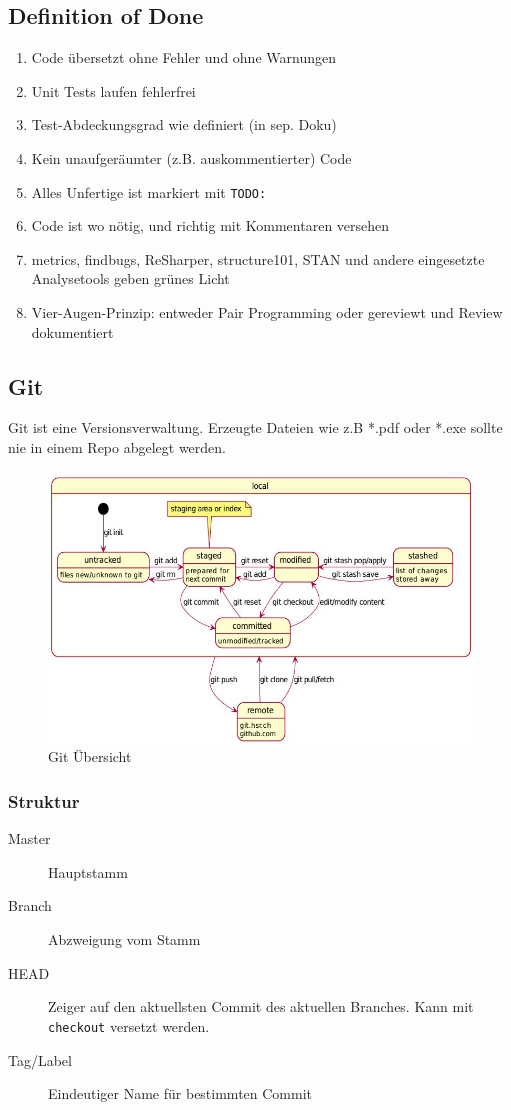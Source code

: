 \subsection{Definition of Done}
\begin{enumerate}
	\item Code übersetzt ohne Fehler und ohne Warnungen
	\item Unit Tests laufen fehlerfrei
	\item Test-Abdeckungsgrad wie definiert (in sep. Doku)
	\item Kein unaufgeräumter (z.B. auskommentierter) Code
	\item Alles Unfertige ist markiert mit \lstinline|TODO:|
	\item Code ist wo nötig, und richtig mit Kommentaren versehen
	\item metrics, findbugs, ReSharper, structure101, STAN und andere 
	eingesetzte Analysetools geben grünes Licht
	\item Vier-Augen-Prinzip: entweder Pair Programming oder gereviewt und 
	Review dokumentiert
\end{enumerate}


\subsection{Git}
Git ist eine Versionsverwaltung. Erzeugte Dateien wie z.B *.pdf oder *.exe sollte nie in einem Repo abgelegt werden.
\begin{figure}[h]
	\centering
	\includegraphics[width=0.9\linewidth]{images/git_overview}
	\caption{Git Übersicht}
	\label{fig:gitoverview}
\end{figure}

\subsubsection{Struktur}
\begin{description}
	\item[Master] Hauptstamm
	\item[Branch] Abzweigung vom Stamm
	\item[HEAD] Zeiger auf den aktuellsten Commit des aktuellen Branches. Kann mit \lstinline|checkout| versetzt werden.
	\item[Tag/Label] Eindeutiger Name für bestimmten Commit
\end{description}

